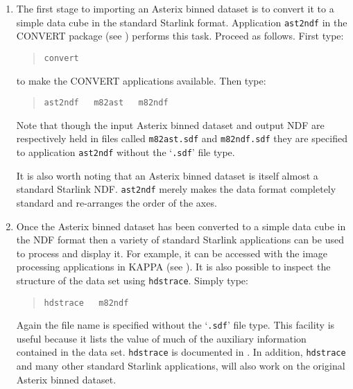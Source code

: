 \begin{enumerate}

  \item The first stage to importing an Asterix binned dataset is to
   convert it to a simple data cube in the standard Starlink
    format.  Application {\tt ast2ndf} in the CONVERT
   package (see \cite{SUN55}) performs this task.
   Proceed as follows.  First type:

  \begin{quote}
   {\tt convert}
  \end{quote}

   to make the CONVERT applications available.  Then type:

  \begin{quote}
   {\tt ast2ndf ~ m82ast ~ m82ndf}
  \end{quote}

   Note that though the input Asterix binned dataset and output NDF are
   respectively
   held in files called {\tt m82ast.sdf} and {\tt m82ndf.sdf} they are
   specified to application {\tt ast2ndf} without the `{\tt .sdf}' file
   type.

   It is also worth noting that an Asterix binned dataset is itself
   almost a standard Starlink NDF.  {\tt ast2ndf} merely makes the
   data format completely standard and re-arranges the order of the
   axes.

  \item Once the Asterix binned dataset has been converted to a simple
   data cube in the NDF format then a variety of standard Starlink
   applications can be used to process and display it.  For example, it
   can be accessed with the image processing applications in KAPPA (see
   \cite{SUN95}).  It is also possible to inspect
   the structure of the data set using {\tt hdstrace}.  Simply type:

  \begin{quote}
   {\tt hdstrace ~ m82ndf}
  \end{quote}

   Again the file name is specified without the `{\tt .sdf}' file type.
   This facility is useful because it lists the value of much of the
   auxiliary information contained in the data set.  {\tt hdstrace}
   is documented in \cite{SUN102}.  In addition,
   {\tt hdstrace} and many other standard Starlink applications, will
   also work on the original Asterix binned dataset.


\end{enumerate}
